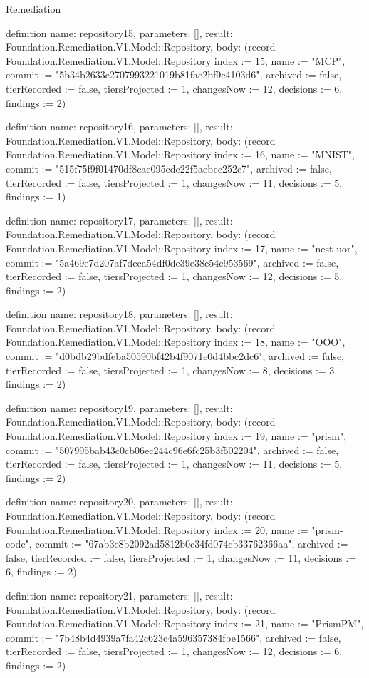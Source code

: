 \begin{lexlean}{Remediation}
\begin{semanticmodule}
definition{
  name: repository15,
  parameters: [],
  result: Foundation.Remediation.V1.Model::Repository,
  body: (record Foundation.Remediation.V1.Model::Repository {index := 15, name := "MCP", commit := "5b34b2633e2707993221019b81fae2bf9c4103d6", archived := false, tierRecorded := false, tiersProjected := 1, changesNow := 12, decisions := 6, findings := 2})
}

definition{
  name: repository16,
  parameters: [],
  result: Foundation.Remediation.V1.Model::Repository,
  body: (record Foundation.Remediation.V1.Model::Repository {index := 16, name := "MNIST", commit := "515f75f9f01470df8cac095cdc22f5aebcc252c7", archived := false, tierRecorded := false, tiersProjected := 1, changesNow := 11, decisions := 5, findings := 1})
}

definition{
  name: repository17,
  parameters: [],
  result: Foundation.Remediation.V1.Model::Repository,
  body: (record Foundation.Remediation.V1.Model::Repository {index := 17, name := "nest-uor", commit := "5a469e7d207af7dcca54df0de39e38c54c953569", archived := false, tierRecorded := false, tiersProjected := 1, changesNow := 12, decisions := 5, findings := 2})
}

definition{
  name: repository18,
  parameters: [],
  result: Foundation.Remediation.V1.Model::Repository,
  body: (record Foundation.Remediation.V1.Model::Repository {index := 18, name := "OOO", commit := "d0bdb29bdfeba50590bf42b4f9071e0d4bbc2dc6", archived := false, tierRecorded := false, tiersProjected := 1, changesNow := 8, decisions := 3, findings := 2})
}

definition{
  name: repository19,
  parameters: [],
  result: Foundation.Remediation.V1.Model::Repository,
  body: (record Foundation.Remediation.V1.Model::Repository {index := 19, name := "prism", commit := "507995bab43c0cb06ec244c96e6fc25b3f502204", archived := false, tierRecorded := false, tiersProjected := 1, changesNow := 11, decisions := 5, findings := 2})
}

definition{
  name: repository20,
  parameters: [],
  result: Foundation.Remediation.V1.Model::Repository,
  body: (record Foundation.Remediation.V1.Model::Repository {index := 20, name := "prism-code", commit := "67ab3e8b2092ad5812b0c34fd074cb33762366aa", archived := false, tierRecorded := false, tiersProjected := 1, changesNow := 11, decisions := 6, findings := 2})
}

definition{
  name: repository21,
  parameters: [],
  result: Foundation.Remediation.V1.Model::Repository,
  body: (record Foundation.Remediation.V1.Model::Repository {index := 21, name := "PrismPM", commit := "7b48b4d4939a7fa42c623c4a596357384fbe1566", archived := false, tierRecorded := false, tiersProjected := 1, changesNow := 12, decisions := 6, findings := 2})
}


\end{semanticmodule}
\end{lexlean}
